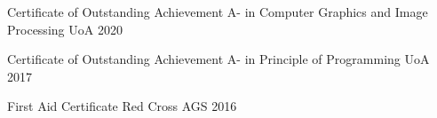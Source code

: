


\begin{cvhonors}

  \cvhonor
    {Certificate of Outstanding Achievement} %
    {A- in Computer Graphics and Image Processing} %
    {UoA} %
    {2020} %

  \cvhonor
    {Certificate of Outstanding Achievement} %
    {A- in Principle of Programming} %
    {UoA} %
    {2017} %

  \cvhonor
    {First Aid Certificate} %
    {Red Cross} %
    {AGS} %
    {2016} %


\end{cvhonors}
